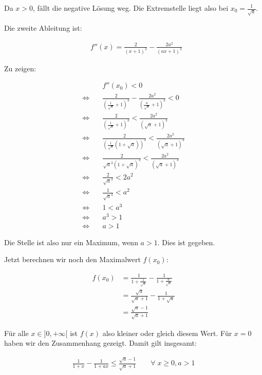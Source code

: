 \documentclass[a4paper,german,12pt,smallheadings]{scrartcl}
\begin{document}
Da $x > 0$, fällt die negative Lösung weg. Die Extremstelle liegt also bei $x_0
= \frac{1}{\sqrt{a}}$.

Die zweite Ableitung ist:

\begin{align*}
  &f''(x) = \frac{2}{(x+1)^3} - \frac{2a^2}{(ax+1)^3}
\end{align*}

Zu zeigen:

\begin{align*}
  &f''(x_0) < 0\\
  \Leftrightarrow\quad&\frac{2}{(\frac{1}{\sqrt{a}}+1)^3} - \frac{2a^2}{(\frac{a}{\sqrt{a}}+1)^3} < 0 \\
  \Leftrightarrow\quad&\frac{2}{(\frac{1}{\sqrt{a}}+1)^3} < \frac{2a^2}{(\sqrt{a}+1)^3} \\
  \Leftrightarrow\quad&\frac{2}{(\frac{1}{\sqrt{a}}(1+\sqrt{a}))^3} < \frac{2a^2}{(\sqrt{a}+1)^3} \\
  \Leftrightarrow\quad&\frac{2}{\sqrt{a}^3 (1+\sqrt{a})^3} < \frac{2a^2}{(\sqrt{a}+1)^3} \\
  \Leftrightarrow\quad&\frac{2}{\sqrt{a}^3} < 2a^2 \\
  \Leftrightarrow\quad&\frac{1}{\sqrt{a}^3} < a^2 \\
  \Leftrightarrow\quad& 1 < a^3 \\
  \Leftrightarrow\quad& a^3 > 1\\
  \Leftrightarrow\quad& a > 1
\end{align*}

Die Stelle ist also nur ein Maximum, wenn $a > 1$. Dies ist gegeben.

Jetzt berechnen wir noch den Maximalwert $f(x_0)$:

\begin{align*}
  f(x_0) &= \frac{1}{1+\frac{1}{\sqrt{a}}} - \frac{1}{1+\frac{a}{\sqrt{a}}} \\
         &= \frac{\sqrt{a}}{\sqrt{a}+1} - \frac{1}{1+\sqrt{a}} \\
         &= \frac{\sqrt{a} - 1}{\sqrt{a}+1}
\end{align*}

Für alle $x \in ]0, +\infty[$ ist $f(x)$ also kleiner oder gleich diesem Wert.
Für $x=0$ haben wir den Zusammenhang gezeigt. Damit gilt insgesamt:

\begin{align*}
  \frac{1}{1+x} - \frac{1}{1+ax} \leq \frac{\sqrt{a} - 1}{\sqrt{a}+1} \qquad \forall\; x \geq 0, a > 1
\end{align*}
\end{document}
